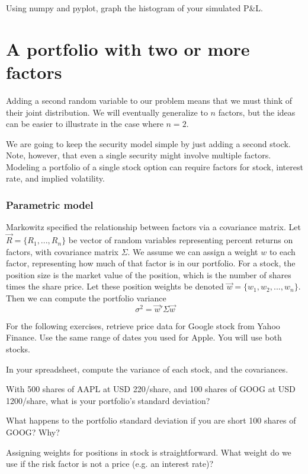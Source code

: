 \documentclass{report}
\numberwithin{problem}{chapter} %
\let\oldroblem\problem
\renewcommand{\problem}{ \oldroblem  \normalfont}
\newcommand{\pnlend}{P\&L}
\begin{document}
\problem Using numpy and pyplot, graph the histogram of your simulated \pnlend. 

\section{A portfolio with two or more factors}
Adding a second random variable to our problem means that we must think of their joint distribution. We will eventually generalize to $n$ factors, but the ideas can be easier to illustrate in the case where $n=2$. 

We are going to keep the security model simple by just adding a second stock. Note, however, that even a single security might involve multiple factors. Modeling a portfolio of a single stock option can require factors for stock, interest rate, and implied volatility. 

\subsubsection{Parametric model}
Markowitz specified the relationship between factors via a covariance matrix. Let $\vec{R}=\{R_1, ...,R_n\}$ be vector of random variables representing percent returns on factors, with covariance matrix $\Sigma$. We assume we can assign a weight $w$ to each factor, representing how much of that factor is in our portfolio. For a stock, the position size is the market value of the position, which is the number of shares times the share price. Let these position weights be denoted $\vec{w} = \{ w_1, w_2, ..., w_n\}$. Then we can compute the portfolio variance 
\begin{equation}
\sigma^2 = \vec{w}' \Sigma \vec{w}
\end{equation}

For the following exercises, retrieve price data for Google stock from Yahoo Finance. Use the same range of dates you used for Apple. You will use both stocks. 

\problem In your spreadsheet, compute the variance of each stock, and the covariances.

\problem With 500 shares of AAPL at USD 220/share, and 100 shares of GOOG at USD 1200/share, what is your portfolio's standard deviation?

\problem What happens to the portfolio standard deviation if you are short 100 shares of GOOG? Why?

\problem Assigning weights for positions in stock is straightforward. What weight do we use if the risk factor is not a price (e.g. an interest rate)?

\printglossaries
\end{document}
